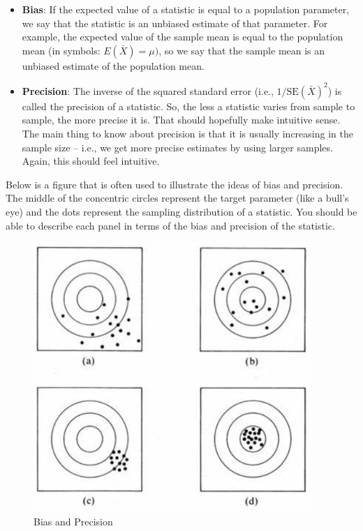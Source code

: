 \documentclass[
  letterpaper,
  DIV=11,
  numbers=noendperiod]{scrreprt}
\begin{document}
\begin{itemize}
\item
  \textbf{Bias}: If the expected value of a statistic is equal to a
  population parameter, we say that the statistic is an unbiased
  estimate of that parameter. For example, the expected value of the
  sample mean is equal to the population mean (in symbols:
  \(E(\bar{X}) = \mu)\), so we say that the sample mean is an unbiased
  estimate of the population mean.
\item
  \textbf{Precision}: The inverse of the squared standard error (i.e.,
  \(1 / \text{SE}(\bar{X})^2\)) is called the precision of a statistic.
  So, the less a statistic varies from sample to sample, the more
  precise it is. That should hopefully make intuitive sense. The main
  thing to know about precision is that it is usually increasing in the
  sample size -- i.e., we get more precise estimates by using larger
  samples. Again, this should feel intuitive.
\end{itemize}

Below is a figure that is often used to illustrate the ideas of bias and
precision. The middle of the concentric circles represent the target
parameter (like a bull's eye) and the dots represent the sampling
distribution of a statistic. You should be able to describe each panel
in terms of the bias and precision of the statistic.

\begin{figure}

{\centering \includegraphics[width=4.16667in,height=\textheight]{files/images/bias_and_precision.png}

}

\caption{\label{fig-bnp}Bias and Precision}

\end{figure}
\end{document}
